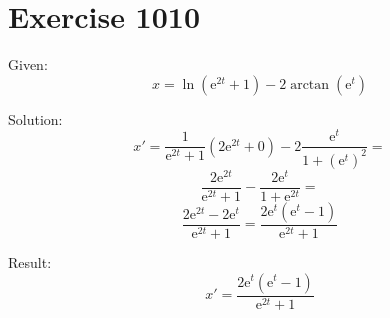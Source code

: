 \documentclass[a4paper, 10pt]{scrartcl}
\newcommand*\euler{\mathrm{e}}
\begin{document}
\section{Exercise 1010}

Given:
\[
x = \ln{(\euler^{2t} + 1)} - 2\arctan{(\euler^{t})}
\]

Solution:
\[
x' = \frac{1}{\euler^{2t} + 1}(2\euler^{2t} + 0) - 2\frac{\euler^{t}}{1 + (\euler^{t})^{2}} =
\]
\[
\frac{2\euler^{2t}}{\euler^{2t} + 1} - \frac{2\euler^{t}}{1 + \euler^{2t}} =
\]
\[
\frac{2\euler^{2t} - 2\euler^{t}}{\euler^{2t} + 1} = \frac{2\euler^{t}(\euler^{t} - 1)}{\euler^{2t} + 1}
\]

Result:
\[
x' = \frac{2\euler^{t}(\euler^{t} - 1)}{\euler^{2t} + 1}
\]
\end{document}
